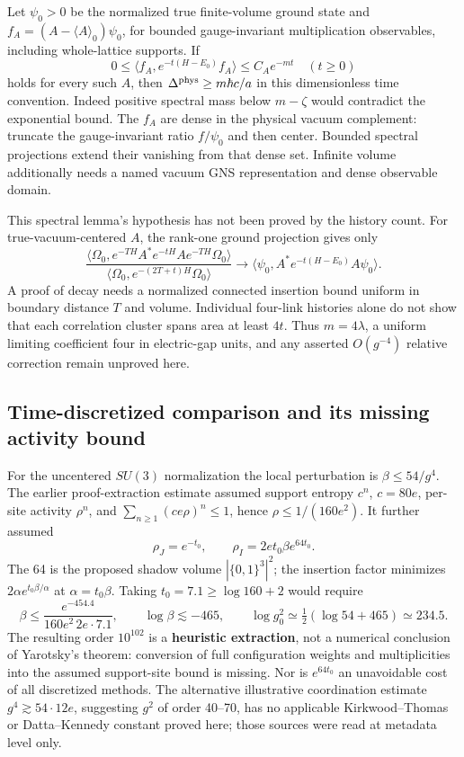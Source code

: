 \documentclass[11pt,a4paper]{article}
\begin{document}
Let \(\psi_0>0\) be the normalized true finite-volume ground state and
\(f_A=(A-\langle A\rangle_0)\psi_0\), for bounded gauge-invariant
multiplication observables, including whole-lattice supports. If
\[0\le\langle f_A,e^{-t(H-E_0)}f_A\rangle\le C_Ae^{-mt}
 \quad(t\ge0)\] holds for every such \(A\), then
\(\Delta^{\rm phys}\ge m\hbar c/a\) in this dimensionless time
convention. Indeed positive spectral mass below \(m-\zeta\) would
contradict the exponential bound. The \(f_A\) are dense in the physical
vacuum complement: truncate the gauge-invariant ratio \(f/\psi_0\) and
then center. Bounded spectral projections extend their vanishing from
that dense set. Infinite volume additionally needs a named vacuum GNS
representation and dense observable domain.

This spectral lemma's hypothesis has not been proved by the history
count. For true-vacuum-centered \(A\), the rank-one ground projection
gives only
\[\frac{\langle\Omega_0,e^{-TH}A^*e^{-tH}Ae^{-TH}\Omega_0\rangle}
 {\langle\Omega_0,e^{-(2T+t)H}\Omega_0\rangle}
 \longrightarrow\langle\psi_0,A^*e^{-t(H-E_0)}A\psi_0\rangle.\] A proof
of decay needs a normalized connected insertion bound uniform in
boundary distance \(T\) and volume. Individual four-link histories alone
do not show that each correlation cluster spans area at least \(4t\).
Thus \(m=4\lambda\), a uniform limiting coefficient four in electric-gap
units, and any asserted \(O(g^{-4})\) relative correction remain
unproved here.

\hypertarget{time-discretized-comparison-and-its-missing-activity-bound}{%
\subsection{Time-discretized comparison and its missing activity
bound}\label{time-discretized-comparison-and-its-missing-activity-bound}}

For the uncentered \(SU(3)\) normalization the local perturbation is
\(\beta\le54/g^4\). The earlier proof-extraction estimate assumed
support entropy \(c^n\), \(c=80e\), per-site activity \(\rho^n\), and
\(\sum_{n\ge1}(ce\rho)^n\le1\), hence \(\rho\le1/(160e^2)\). It further
assumed \[\rho_J=e^{-t_0},\qquad \rho_I=2et_0\beta e^{64t_0}.\] The 64
is the proposed shadow volume \(|\{0,1\}^3|^2\); the insertion factor
minimizes \(2\alpha e^{t_0\beta/\alpha}\) at \(\alpha=t_0\beta\). Taking
\(t_0=7.1\ge\log160+2\) would require
\[\beta\le\frac{e^{-454.4}}{160e^2\,2e\cdot7.1},\qquad
 \log\beta\lesssim-465,\qquad
 \log g_0^2\simeq\tfrac12(\log54+465)\simeq234.5.\] The resulting order
\(10^{102}\) is a \textbf{heuristic extraction}, not a numerical
conclusion of Yarotsky's theorem: conversion of full configuration
weights and multiplicities into the assumed support-site bound is
missing. Nor is \(e^{64t_0}\) an unavoidable cost of all discretized
methods. The alternative illustrative coordination estimate
\(g^4\gtrsim54\cdot12e\), suggesting \(g^2\) of order 40--70, has no
applicable Kirkwood--Thomas or Datta--Kennedy constant proved here;
those sources were read at metadata level only.
\end{document}
